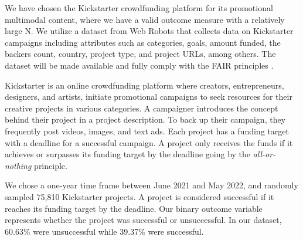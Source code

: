 We have chosen the Kickstarter crowdfunding platform for its promotional multimodal content, where we have a valid outcome measure with a relatively large N. We utilize a dataset from Web Robots \cite{robots2018kickstarter} that collects data on  Kickstarter campaigns including attributes such as categories, goals, amount funded, the backers count, country, project type, and project URLs, among others. The dataset will be made available and fully comply with the FAIR principles \cite{force11}.

Kickstarter is an online crowdfunding platform where creators, entrepreneurs, designers, and artists, initiate promotional campaigns to seek resources for their creative projects in various categories. A campaigner introduces the concept behind their project in a project description. To back up their campaign, they frequently post videos, images, and text ads. Each project has a funding target with a deadline for a successful campaign. A project only receives the funds if it achieves or surpasses its funding target by the deadline going by the \textit{all-or-nothing} principle. 

We chose a one-year time frame between June 2021 and May 2022, and randomly sampled 75,810 Kickstarter projects. A project is considered successful if it reaches its funding target by the deadline. Our binary outcome variable represents whether the project was successful or unsuccessful. In our dataset, 60.63\% were unsuccessful while 39.37\% were successful. 
